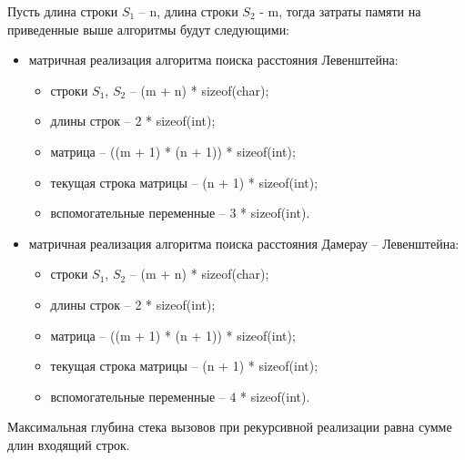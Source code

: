 Пусть длина строки $S_{1}$ -- n, длина строки $S_{2}$ - m, тогда затраты памяти на приведенные выше алгоритмы будут следующими:
\begin{itemize}
	\item матричная реализация алгоритма поиска расстояния Левенштейна:\begin{itemize}
		\item строки $S_{1}$, $S_{2}$ -- (m + n) * sizeof(char);
		\item длины строк -- 2 * sizeof(int);
		\item матрица -- ((m + 1) * (n + 1)) * sizeof(int);
		\item текущая строка матрицы -- (n + 1) * sizeof(int);
		\item вспомогательные переменные --  3 * sizeof(int).
	\end{itemize}
\end{itemize}

\begin{itemize}
	\item матричная реализация алгоритма поиска расстояния Дамерау -- Левенштейна:\begin{itemize}
		\item строки $S_{1}$, $S_{2}$ -- (m + n) * sizeof(char);
		\item длины строк -- 2 * sizeof(int);
		\item матрица -- ((m + 1) * (n + 1)) * sizeof(int);
		\item текущая строка матрицы -- (n + 1) * sizeof(int);
		\item вспомогательные переменные --  4 * sizeof(int).
	\end{itemize}
\end{itemize}

Максимальная глубина стека вызовов при рекурсивной реализации равна сумме длин входящий строк.

